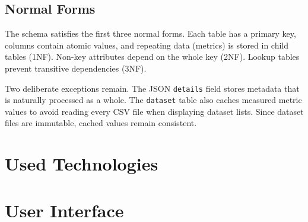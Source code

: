 \subsection{Normal Forms}

The schema satisfies the first three normal forms. Each table has a primary key,
columns contain atomic values, and repeating data (metrics) is stored in child
tables (1NF). Non-key attributes depend on the whole key (2NF). Lookup tables
prevent transitive dependencies (3NF).

Two deliberate exceptions remain. The JSON \texttt{details} field stores metadata
that is naturally processed as a whole. The \texttt{dataset} table also caches
measured metric values to avoid reading every CSV file when displaying dataset
lists. Since dataset files are immutable, cached values remain consistent.

\section{Used Technologies}
\label{sec:tech}

\section{User Interface}
\label{sec:ui}
